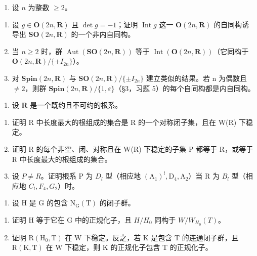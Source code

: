 \begin{enumerate}
\def\labelenumi{\arabic{enumi})}
\setcounter{enumi}{3}
\tightlist
\item
  设 \(n\) 为整数 \(\geq 2\)。
\end{enumerate}

\begin{enumerate}
\def\labelenumi{\alph{enumi})}
\item
  设 \(g \in \mathbf{O}(2n, \mathbf{R})\) 且 \(\det g = -1\)；证明 \(\operatorname{Int} g\) 这一 \(\mathbf{O}(2n, \mathbf{R})\) 的自同构诱导出 \(\mathbf{SO}(2n, \mathbf{R})\) 的一个非内自同构。
\item
  当 \(n \geq 2\) 时，群 \(\operatorname{Aut}(\mathbf{SO}(2n, \mathbf{R}))\) 等于 \(\operatorname{Int}(\mathbf{O}(2n, \mathbf{R}))\)（它同构于 \(\mathbf{O}(2n, \mathbf{R}) / \{\pm I_{2n}\}\)）。
\item
  对 \(\mathbf{Spin}(2n,\mathbf{R})\) 与 \(\mathbf{SO}(2n,\mathbf{R})/\{\pm I_{2n}\}\) 建立类似的结果。若 n 为偶数且 \(\neq 2\)，则群 \(\mathbf{Spin}(2n,\mathbf{R})/\{1,\varepsilon\}\)（§3，习题 5）的每个自同构都是内自同构。
\end{enumerate}

\begin{enumerate}
\def\labelenumi{\arabic{enumi})}
\setcounter{enumi}{4}
\tightlist
\item
  设 \(\mathbf{R}\) 是一个既约且不可约的根系。
\end{enumerate}

\begin{enumerate}
\def\labelenumi{\alph{enumi})}
\item
  证明 R 中长度最大的根组成的集合是 R 的一个对称闭子集，且在 W(R) 下稳定。
\item
  证明 R 的每个非空、闭、对称且在 W(R) 下稳定的子集 P 都等于 R，或等于 R 中长度最大的根组成的集合。
\item
  设 \(P \neq R\)。证明根系 P 为 \(D_{l}\) 型（相应地 \((\mathrm{A}_{1})^{l}, \mathrm{D}_{4}, \mathrm{A}_{2}\)）当 R 为 \(B_{l}\) 型（相应地 \(C_{l}, F_{4}, G_{2}\)）时。
\end{enumerate}

\begin{enumerate}
\def\labelenumi{\arabic{enumi})}
\setcounter{enumi}{5}
\tightlist
\item
  设 \(\mathrm{H}\) 是 \(\mathrm{G}\) 的包含 \(\mathrm{N}_{\mathrm{G}}(\mathrm{T})\) 的闭子群。
\end{enumerate}

\begin{enumerate}
\def\labelenumi{\alph{enumi})}
\item
  证明 H 等于它在 G 中的正规化子，且 \(H/H_{0}\) 同构于 \(W/W_{H_{0}}(T)\)。
\item
  证明 \(\mathrm{R}(\mathrm{H}_{0},\mathrm{T})\) 在 W 下稳定。反之，若 K 是包含 T 的连通闭子群，且 \(\mathrm{R}(\mathrm{K},\mathrm{T})\) 在 W 下稳定，则 K 的正规化子包含 T 的正规化子。
\end{enumerate}

